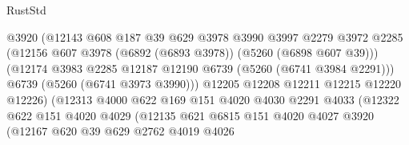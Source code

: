 \begin{lexlean}{RustStd}
\begin{coremodule}
                                  @3920
                                  (@12143
                                    @608
                                    @187
                                    @39
                                    @629
                                    @3978
                                    @3990
                                    @3997
                                    @2279
                                    @3972
                                    @2285
                                    (@12156
                                      @607
                                      @3978
                                      (@6892 (@6893 @3978))
                                      (@5260 (@6898 @607 @39)))
                                    (@12174
                                      @3983
                                      @2285
                                      @12187
                                      @12190
                                      @6739
                                      (@5260 (@6741 @3984 @2291)))
                                    @6739
                                    (@5260 (@6741 @3973 @3990)))
                                  @12205
                                  @12208
                                  @12211
                                  @12215
                                  @12220
                                  @12226)
                                (@12313
                                  @4000
                                  @622
                                  @169
                                  @151
                                  @4020
                                  @4030
                                  @2291
                                  @4033
                                  (@12322
                                    @622
                                    @151
                                    @4020
                                    @4029
                                    (@12135
                                      @621
                                      @6815
                                      @151
                                      @4020
                                      @4027
                                      @3920
                                      (@12167
                                        @620
                                        @39
                                        @629
                                        @2762
                                        @4019
                                        @4026

\end{coremodule}
\end{lexlean}

